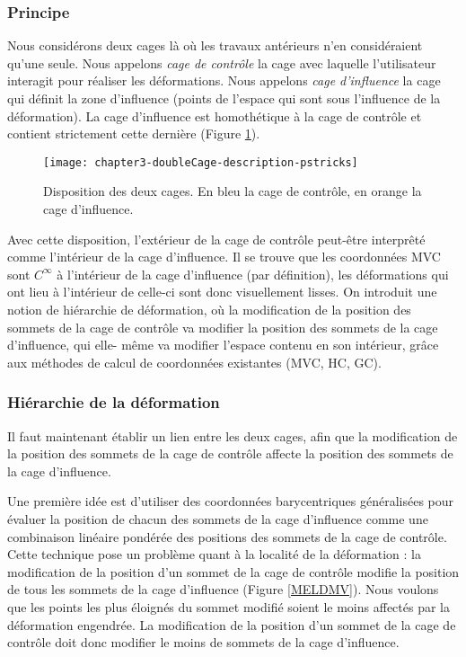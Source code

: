 \subsubsection{Principe}

Nous considérons deux cages là où les travaux antérieurs n'en considéraient
qu'une seule. Nous appelons \textit{cage de contrôle} la cage avec laquelle
l'utilisateur interagit pour réaliser les déformations. Nous appelons
\textit{cage d'influence} la cage qui définit la zone d'influence (points de
l'espace qui sont sous l'influence de la déformation). La cage d'influence est
homothétique à la cage de contrôle et contient strictement cette dernière
(Figure \ref{MELDou}).

\begin{figure}[ht]
  \begin{center}
    \texttt{[image: chapter3-doubleCage-description-pstricks]}

    \caption[Disposition des cages de contrôle et d'influence] {Disposition
des deux cages. En bleu la cage de contrôle, en orange la cage d'influence.}

    \label{MELDou}
  \end{center}
\end{figure}

Avec cette disposition, l'extérieur de la cage de contrôle peut-être
interprêté comme l'intérieur de la cage d'influence. Il se trouve que les
coordonnées MVC sont $C^{\infty}$ à l'intérieur de la cage d'influence (par
définition), les déformations qui ont lieu à l'intérieur de celle-ci sont donc
visuellement lisses. On introduit une notion de hiérarchie de déformation, où
la modification de la position des sommets de la cage de contrôle va modifier
la position des sommets de la cage d'influence, qui elle- même va modifier
l'espace contenu en son intérieur, grâce aux méthodes de calcul de coordonnées
existantes (MVC, HC, GC). \\

\subsubsection{Hiérarchie de la déformation}

Il faut maintenant établir un lien entre les deux cages, afin que la
modification de la position des sommets de la cage de contrôle affecte la
position des sommets de la cage d'influence.

Une première idée est d'utiliser des coordonnées barycentriques généralisées
pour évaluer la position de chacun des sommets de la cage d'influence comme
une combinaison linéaire pondérée des positions des sommets de la cage de
contrôle. Cette technique pose un problème quant à la localité de la
déformation : la modification de la position d'un sommet de la cage de
contrôle modifie la position de tous les sommets de la cage d'influence
(Figure \ref{MELDMV}). Nous voulons que les points les plus éloignés du sommet
modifié soient le moins affectés par la déformation engendrée. La modification
de la position d'un sommet de la cage de contrôle doit donc modifier le moins
de sommets de la cage d'influence.

